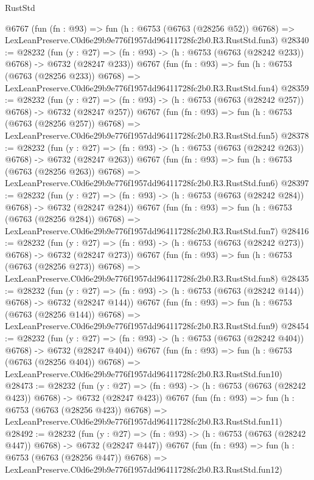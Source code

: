 \begin{lexlean}{RustStd}
\begin{coremodule}
    @6767
    (fun (fn : @93) =>
    fun (h : @6753 (@6763 (@28256 @52)) @6768) =>
    LexLeanPreserve.C0d6e29b9e776f1957dd96411728fc2b0.R3.RustStd.fun3)
@28340 := @28232
    (fun (y : @27) => (fn : @93) -> (h : @6753 (@6763 (@28242 @233)) @6768) -> @6732 (@28247 @233))
    @6767
    (fun (fn : @93) =>
    fun (h : @6753 (@6763 (@28256 @233)) @6768) =>
    LexLeanPreserve.C0d6e29b9e776f1957dd96411728fc2b0.R3.RustStd.fun4)
@28359 := @28232
    (fun (y : @27) => (fn : @93) -> (h : @6753 (@6763 (@28242 @257)) @6768) -> @6732 (@28247 @257))
    @6767
    (fun (fn : @93) =>
    fun (h : @6753 (@6763 (@28256 @257)) @6768) =>
    LexLeanPreserve.C0d6e29b9e776f1957dd96411728fc2b0.R3.RustStd.fun5)
@28378 := @28232
    (fun (y : @27) => (fn : @93) -> (h : @6753 (@6763 (@28242 @263)) @6768) -> @6732 (@28247 @263))
    @6767
    (fun (fn : @93) =>
    fun (h : @6753 (@6763 (@28256 @263)) @6768) =>
    LexLeanPreserve.C0d6e29b9e776f1957dd96411728fc2b0.R3.RustStd.fun6)
@28397 := @28232
    (fun (y : @27) => (fn : @93) -> (h : @6753 (@6763 (@28242 @284)) @6768) -> @6732 (@28247 @284))
    @6767
    (fun (fn : @93) =>
    fun (h : @6753 (@6763 (@28256 @284)) @6768) =>
    LexLeanPreserve.C0d6e29b9e776f1957dd96411728fc2b0.R3.RustStd.fun7)
@28416 := @28232
    (fun (y : @27) => (fn : @93) -> (h : @6753 (@6763 (@28242 @273)) @6768) -> @6732 (@28247 @273))
    @6767
    (fun (fn : @93) =>
    fun (h : @6753 (@6763 (@28256 @273)) @6768) =>
    LexLeanPreserve.C0d6e29b9e776f1957dd96411728fc2b0.R3.RustStd.fun8)
@28435 := @28232
    (fun (y : @27) => (fn : @93) -> (h : @6753 (@6763 (@28242 @144)) @6768) -> @6732 (@28247 @144))
    @6767
    (fun (fn : @93) =>
    fun (h : @6753 (@6763 (@28256 @144)) @6768) =>
    LexLeanPreserve.C0d6e29b9e776f1957dd96411728fc2b0.R3.RustStd.fun9)
@28454 := @28232
    (fun (y : @27) => (fn : @93) -> (h : @6753 (@6763 (@28242 @404)) @6768) -> @6732 (@28247 @404))
    @6767
    (fun (fn : @93) =>
    fun (h : @6753 (@6763 (@28256 @404)) @6768) =>
    LexLeanPreserve.C0d6e29b9e776f1957dd96411728fc2b0.R3.RustStd.fun10)
@28473 := @28232
    (fun (y : @27) => (fn : @93) -> (h : @6753 (@6763 (@28242 @423)) @6768) -> @6732 (@28247 @423))
    @6767
    (fun (fn : @93) =>
    fun (h : @6753 (@6763 (@28256 @423)) @6768) =>
    LexLeanPreserve.C0d6e29b9e776f1957dd96411728fc2b0.R3.RustStd.fun11)
@28492 := @28232
    (fun (y : @27) => (fn : @93) -> (h : @6753 (@6763 (@28242 @447)) @6768) -> @6732 (@28247 @447))
    @6767
    (fun (fn : @93) =>
    fun (h : @6753 (@6763 (@28256 @447)) @6768) =>
    LexLeanPreserve.C0d6e29b9e776f1957dd96411728fc2b0.R3.RustStd.fun12)

\end{coremodule}
\end{lexlean}
